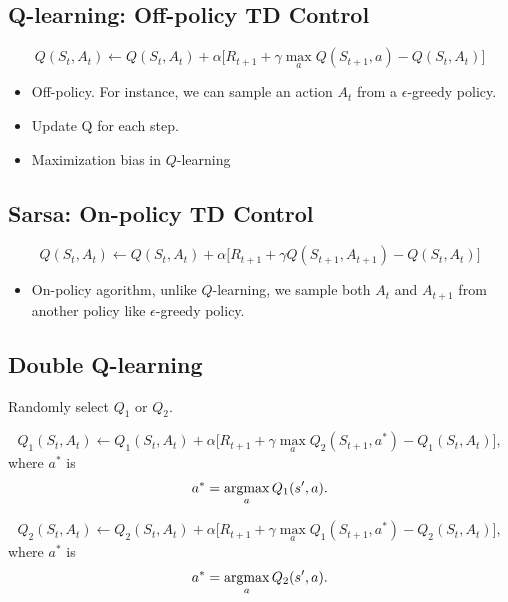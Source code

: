 \subsection{Q-learning: Off-policy TD Control}

$$Q(S_t, A_t) \leftarrow Q(S_t, A_t)+ \alpha \Big[R_{t+1}+\gamma \max_a Q(S_{t+1}, a)-Q(S_t, A_t)\Big] $$

\begin{itemize}
	\item Off-policy. For instance, we can sample an action $A_t$ from a $\epsilon$-greedy policy. 
	\item Update Q for each step.
	\item Maximization bias in $Q$-learning
\end{itemize}

\subsection{Sarsa: On-policy TD Control}
$$Q(S_t, A_t) \leftarrow Q(S_t, A_t)+ \alpha \Big[R_{t+1}+\gamma Q(S_{t+1}, A_{t+1})-Q(S_t, A_t)\Big] $$
\begin{itemize}
	\item On-policy agorithm, unlike $Q$-learning, we sample both $A_t$ and $A_{t+1}$ from another policy like $\epsilon$-greedy policy. 
\end{itemize}


\subsection{Double Q-learning}

Randomly select $Q_1$ or $Q_2$.

$$Q_1(S_t, A_t) \leftarrow Q_1(S_t, A_t)+ \alpha \Big[R_{t+1}+\gamma \max_a Q_2(S_{t+1}, a^*)-Q_1(S_t, A_t)\Big], $$
where $a^*$ is 
$$a^* = \operatorname*{\operatorname{argmax}}_a Q_1(s',a).$$

$$Q_2(S_t, A_t) \leftarrow Q_2(S_t, A_t)+ \alpha \Big[R_{t+1}+\gamma \max_a Q_1(S_{t+1}, a^*)-Q_2(S_t, A_t)\Big], $$
where $a^*$ is 
$$a^* = \operatorname*{\operatorname{argmax}}_a Q_2(s',a).$$
